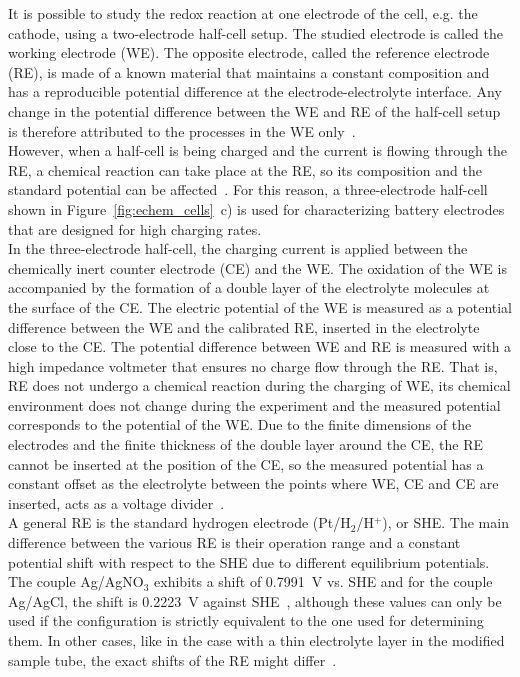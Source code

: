 It is possible to study the redox reaction at one electrode of the cell, e.g. the cathode, using a two-electrode half-cell setup. The studied electrode is called the working electrode (WE). The opposite electrode, called the reference electrode (RE), is made of a known material that maintains a constant composition and has a reproducible potential difference at the electrode-electrolyte interface. Any change in the potential difference between the WE and RE of the half-cell setup is therefore attributed to the processes in the WE only~\cite{Bard_book}.\\
However, when a half-cell is being charged and the current is flowing through the RE, a chemical reaction can take place at the RE, so its composition and the standard potential can be affected~\cite{Bard_book,DOM}. For this reason, a three-electrode half-cell shown in Figure~\ref{fig:echem_cells}~c) is used for characterizing battery electrodes that are designed for high charging rates.\\

In the three-electrode half-cell, the charging current is applied between the chemically inert counter electrode (CE) and the WE. The oxidation of the WE is accompanied by the formation of a double layer of the electrolyte molecules at the surface of the CE. The electric potential of the WE is measured as a potential difference between the WE and the calibrated RE, inserted in the electrolyte close to the CE. The potential difference between WE and RE is measured with a high impedance voltmeter that ensures no charge flow through the RE. That is, RE does not undergo a chemical reaction during the charging of WE, its chemical environment does not change during the experiment and the measured potential corresponds to the potential of the WE. Due to the finite dimensions of the electrodes and the finite thickness of the double layer around the CE, the RE cannot be inserted at the position of the CE, so the measured potential has a constant offset as the electrolyte between the points where WE, CE and CE are inserted, acts as a voltage divider~\cite{Bard_book}.\\

A general RE is the standard hydrogen electrode (Pt/H$_2$/H$^+$), or SHE. The main difference between the various RE is their operation range and a constant potential shift with respect to the SHE due to different equilibrium potentials. The couple Ag/AgNO$_3$ exhibits a shift of 0.7991~V vs. SHE and for the couple Ag/AgCl, the shift is 0.2223~V against SHE~\cite{Bard_book,DOM}, although these values can only be used if the configuration is strictly equivalent to the one used for determining them. In other cases, like in the case with a thin electrolyte layer in the modified sample tube, the exact shifts of the RE might differ~\cite{DOM}.\\

